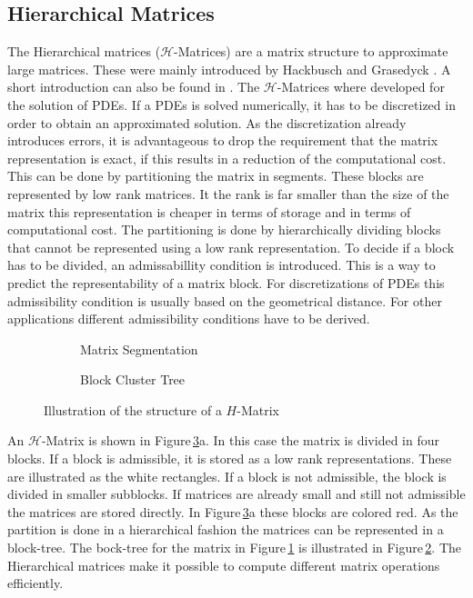 \documentclass[doctype=mastersthesis,BCOR=15mm,biblatex]{ldvbook}%
\begin{document}
\subsection{Hierarchical Matrices}\label{subsec:H-mat}
The Hierarchical matrices ($\mathcal{H}$-Matrices) are a matrix structure to approximate large matrices. These were mainly introduced by Hackbusch \cite{hackbusch_hierarchische_2009} and Grasedyck \cite{grasedyck_theorie_2001}.
A short introduction can also be found in \cite{grasedyck_adaptive_2004}.
The $\mathcal{H}$-Matrices where developed for the solution of PDEs.
If a PDEs is solved numerically, it has to be discretized in order to obtain an approximated solution.
As the discretization already introduces errors, it is advantageous to drop the requirement that the matrix representation is exact, if this results in a reduction of the computational cost.
This can be done by partitioning the matrix in segments. These blocks are represented by low rank matrices. It the rank is far smaller than the size of the matrix this representation is cheaper in terms of storage and in terms of computational cost.
The partitioning is done by hierarchically dividing blocks that cannot be represented using a low rank representation.
To decide if a block has to be divided, an admissabillity condition is introduced.
This is a way to predict the representability of a matrix block.
For discretizations of PDEs this admissibility condition is usually based on the geometrical distance.
For other applications different admissibility conditions have to be derived.

\begin{figure}
	\centering
	\begin{subfigure}[b]{0.45\textwidth}
		\centering
		
		\caption{Matrix Segmentation}
		\label{fig:strukturh-matrix_a}
	\end{subfigure}
	\begin{subfigure}[b]{0.45\textwidth}
	\centering
	\resizebox{0.7\textwidth}{!}{
	
	}
	\caption{Block Cluster Tree}
	\label{fig:strukturh-matrix_b}
	\end{subfigure}
	\caption{Illustration of the structure of a $H$-Matrix}
	\label{fig:strukturh-matrix}
\end{figure}


An $\mathcal{H}$-Matrix is shown in Figure\,\ref{fig:strukturh-matrix}a. 
In this case the matrix is divided in four blocks.
If a block is admissible, it is stored as a low rank representations. These are illustrated as the white rectangles.
If a block is not admissible, the block is divided in smaller subblocks.
If matrices are already small and still not admissible the matrices are stored directly. In Figure\,\ref{fig:strukturh-matrix}a these blocks are colored red.
As the partition is done in a hierarchical fashion the matrices can be represented in a block-tree. 
The bock-tree for the matrix in Figure\,\ref{fig:strukturh-matrix_a} is illustrated in Figure\,\ref{fig:strukturh-matrix_b}.
The Hierarchical matrices make it possible to compute different matrix operations efficiently. %
\end{document}

